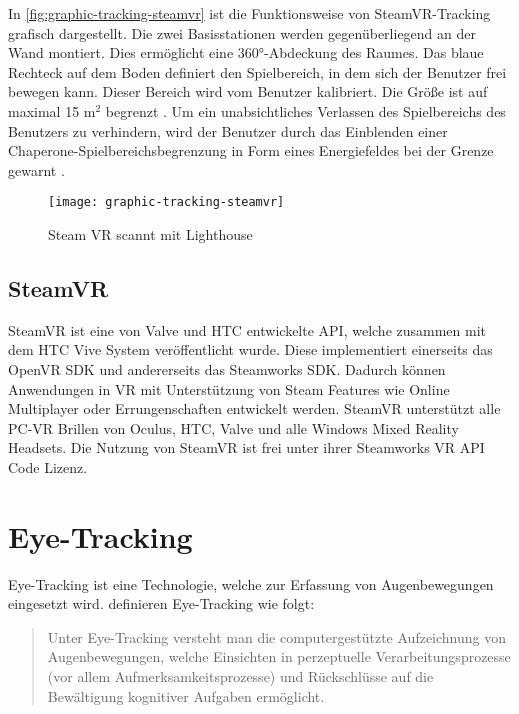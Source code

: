 In \autoref{fig:graphic-tracking-steamvr} ist die Funktionsweise von SteamVR-Tracking grafisch dargestellt. Die zwei Basisstationen werden gegenüberliegend an der Wand montiert. Dies ermöglicht eine 360°-Abdeckung des Raumes. Das blaue Rechteck auf dem Boden definiert den Spielbereich, in dem sich der Benutzer frei bewegen kann. Dieser Bereich wird vom Benutzer kalibriert. Die Größe ist auf maximal 15 m$^2$ begrenzt \cite{ViveProduct}. Um ein unabsichtliches Verlassen des Spielbereichs des Benutzers zu verhindern, wird der Benutzer durch das Einblenden einer Chaperone-Spielbereichsbegrenzung in Form eines Energiefeldes bei der Grenze gewarnt \cite{ViveProduct}. 

\begin{figure}[!htbp]
	\centering
	\texttt{[image: graphic-tracking-steamvr]}
	\caption[Steam VR scannt mit Lighthouse]{Steam VR scannt mit Lighthouse \cite{Sauter.2015}}
	\label{fig:graphic-tracking-steamvr}
\end{figure}

\subsection{SteamVR}
\label{section:steamvr}
SteamVR ist eine von Valve und HTC entwickelte API, welche zusammen mit dem HTC Vive System veröffentlicht wurde. Diese implementiert einerseits das OpenVR \ac{SDK} und andererseits das Steamworks \ac{SDK}. Dadurch können Anwendungen in VR mit Unterstützung von Steam Features wie Online Multiplayer oder Errungenschaften entwickelt werden. SteamVR unterstützt alle PC-\ac{VR} Brillen von Oculus, HTC, Valve und alle Windows Mixed Reality Headsets. Die Nutzung von SteamVR ist frei unter ihrer Steamworks VR API Code Lizenz.\cite{steamvr.2020}

\section{Eye-Tracking}
\label{section:eyetracking}
Eye-Tracking ist eine Technologie, welche zur Erfassung von Augenbewegungen eingesetzt wird. \citeauthor{BartlPokorny.2013} definieren Eye-Tracking wie folgt: 

\begin{quote}
	\glqq Unter Eye-Tracking versteht man die computergestützte Aufzeichnung von Augenbewegungen, welche Einsichten in perzeptuelle Verarbeitungsprozesse (vor allem Aufmerksamkeitsprozesse) und Rückschlüsse auf die Bewältigung kognitiver Aufgaben ermöglicht.\grqq \cite{BartlPokorny.2013} 
\end{quote}

